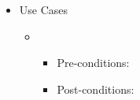 \begin {itemize}
\item Use Cases
\begin {itemize}
\item { }\\ 
\begin {itemize}
\item Pre-conditions:\\ 

\item Post-conditions:\\ 
\end {itemize}
\end {itemize}
\end {itemize}

